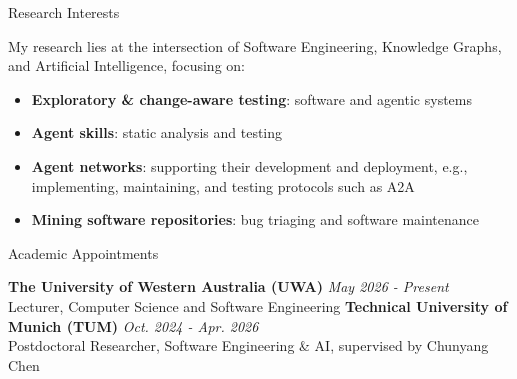 \documentclass[
	11pt, %
]{resume} %
\begin{document}

\begin{rSection}{Research Interests}
	


My research lies at the intersection of Software Engineering, Knowledge Graphs, and Artificial Intelligence, focusing on:
\begin{itemize}
    \item \textbf{Exploratory \& change-aware testing}: software and agentic systems
    \item \textbf{Agent skills}: static analysis and testing
    \item \textbf{Agent networks}: supporting their development and deployment, e.g., implementing, maintaining, and testing protocols such as A2A
    \item \textbf{Mining software repositories}: bug triaging and software maintenance
\end{itemize}
	
\end{rSection}

\begin{rSection}{Academic Appointments}

\textbf{The University of Western Australia (UWA)} \hfill \textit{May 2026 - Present} \\
Lecturer, Computer Science and Software Engineering
\newline\newline
\textbf{Technical University of Munich (TUM)} \hfill \textit{Oct. 2024 - Apr. 2026} \\
Postdoctoral Researcher, Software Engineering \& AI, supervised by Chunyang Chen

\end{rSection}
\end{document}
